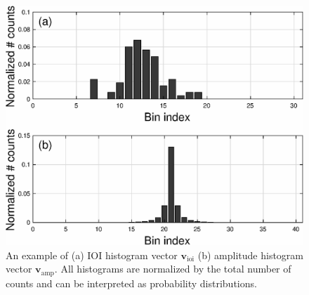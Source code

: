 \documentclass[conference]{IEEEtran}
\begin{document}
\begin{figure}
    \centering
    \includegraphics[width = 8 cm]{./figs/ioi_hist_examples.eps}
    \caption{An example of (a) IOI histogram vector $\mathbf{v}_\mathrm{ioi}$ (b) amplitude histogram vector $\mathbf{v}_\mathrm{amp}$. All histograms are normalized by the total number of counts and can be interpreted as probability distributions.} 
    \label{fig:ioi_hist_example}
\end{figure}
\end{document}
